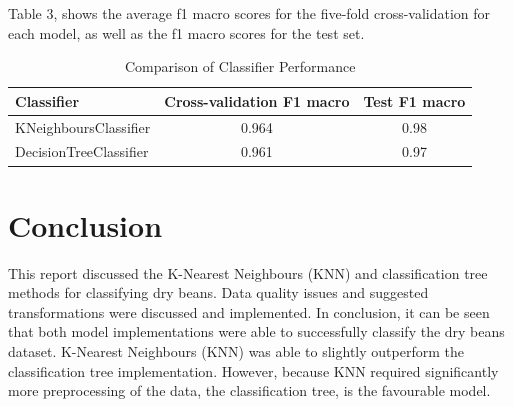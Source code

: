 \documentclass[conference]{IEEEtran}
\begin{document}
Table 3, shows the average f1 macro scores for the five-fold cross-validation for each model, as well as the f1 macro scores for the test set.

\begin{table}[h]
    \centering
    \caption{Comparison of Classifier Performance}
    \begin{tabular}{lcc}
        \toprule
        Classifier & Cross-validation F1 macro & Test F1 macro \\
        \midrule
        KNeighboursClassifier & 0.964 & 0.98 \\
        DecisionTreeClassifier & 0.961 & 0.97\\
        \bottomrule
    \end{tabular}
\end{table}

\section{Conclusion}
This report discussed the K-Nearest Neighbours (KNN) and classification tree methods for classifying dry beans.
Data quality issues and suggested transformations were discussed and implemented.
In conclusion, it can be seen that both model implementations were able to successfully classify the dry beans dataset.
K-Nearest Neighbours (KNN) was able to slightly outperform the classification tree implementation. However, because
KNN required significantly more preprocessing of the data, the classification tree, is the favourable model.

\nocite{*}
\printbibliography
\end{document}
